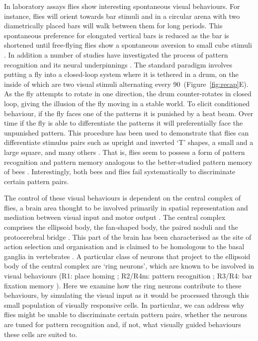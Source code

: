 \documentclass[10pt]{article}
\begin{document}
In laboratory assays flies show interesting spontaneous visual behaviours. For instance, flies will orient towards bar stimuli \cite{Reichardt1969,Gotz1987} and in a circular arena with two diametrically placed bars will walk between them for long periods. This spontaneous preference for elongated vertical bars is reduced as the bar is shortened until free-flying flies show a spontaneous aversion to small cube stimuli \cite{Maimon2008}. In addition a number of studies have investigated the process of pattern recognition and its neural underpinnings \cite{Ernst1999,Liu2006,Pan2009}. The standard paradigm involves putting a fly into a closed-loop system where it is tethered in a drum, on the inside of which are two visual stimuli alternating every 90\degree\ (Figure~\ref{fig:recap}E). As the fly attempts to rotate in one direction, the drum counter-rotates in closed loop, giving the illusion of the fly moving in a stable world. To elicit conditioned behaviour, if the fly faces one of the patterns it is punished by a heat beam. Over time if the fly is able to differentiate the patterns it will preferentially face the unpunished pattern. This procedure has been used to demonstrate that flies can differentiate stimulus pairs such as upright and inverted `T' shapes, a small and a large square, and many others \cite{Ernst1999}. That is, flies seem to possess a form of pattern recognition and pattern memory analogous to the better-studied pattern memory of bees \cite{vonFrisch1914,Giurfa1997,Horridge2009}. Interestingly, both bees and flies fail systematically to discriminate certain pattern pairs. 

The control of these visual behaviours is dependent on the central complex of flies, a brain area thought to be involved primarily in spatial representation and mediation between visual input and motor output \cite{Pfeiffer2014}. The central complex comprises the ellipsoid body, the fan-shaped body, the paired noduli and the protocerebral bridge \cite{Young2010}. This part of the brain has been characterised as the site of action selection and organisation and is claimed to be homologous to the basal ganglia in vertebrates \cite{Strausfeld2013}. A particular class of neurons that project to the ellipsoid body of the central complex are `ring neurons', which are known to be involved in visual behaviours (R1: place homing \cite{Sitaraman2008,Sitaraman2010,Ofstad2011}; R2/R4m: pattern recognition \cite{Ernst1999,Liu2006,Pan2009}; R3/R4: bar fixation memory \cite{Neuser2008}). Here we examine how the ring neurons contribute to these behaviours, by simulating the visual input as it would be processed through this small population of visually responsive cells. In particular, we can address why flies might be unable to discriminate certain pattern pairs, whether the neurons are tuned for pattern recognition and, if not, what visually guided behaviours these cells are suited to.
\end{document}
